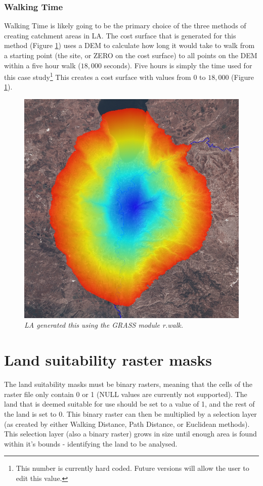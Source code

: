     \subsubsection{Walking Time}
      Walking Time is likely going to be the primary choice of the three methods of
      creating catchment areas in LA.  The cost surface that is
      generated for this method (Figure \ref{fig:rwalk}) uses a DEM to calculate
      how long it would take to walk from a starting point (the site, or ZERO on
      the cost surface) to all points on the DEM within a five hour walk ($18,000$
      seconds). Five hours is simply the time used for this case
      study\footnote{This number is currently hard coded. Future versions will
      allow the user to edit this value.} This creates a cost surface with values
      from $0$ to $18,000$ (Figure \ref{fig:rwalk}).  

\begin{figure}[htbp] 
  \includegraphics[scale=0.29]{./images/rwalkShuna.jpg}
  \caption{\label{fig:rwalk}\textit{LA generated this using the GRASS module r.walk.}}
\end{figure}

\section{Land suitability raster masks} 
  The land suitability masks must be binary rasters, meaning that the cells of
  the raster file only contain 0 or 1 (NULL values are currently not supported).
  The land that is deemed suitable for use should be set to a value of 1, and the
  rest of the land is set to 0.  This binary raster  can then be multiplied by a
  selection layer (as created by either Walking Distance, Path Distance,
  or Euclidean methods).  This selection layer (also a binary raster) grows in
  size until enough area is
  found within it's bounds - identifying the land to be analysed.
  
